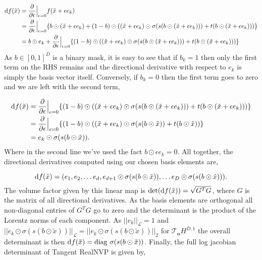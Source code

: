 \begin{align*}
    \textnormal{d}f(\tilde{x}) &= \frac{\partial}{\partial \epsilon} \Big |_{\epsilon=0} f(\tilde{x} + \epsilon e_k)\\
    & = \frac{\partial}{\partial \epsilon} \Big |_{\epsilon=0} \{b \odot (\tilde{x} + \epsilon e_k) + (1 - b)\odot((\tilde{x} + \epsilon e_k) \odot \sigma(s(b \odot (\tilde{x} + \epsilon e_k))) + t(b \odot (\tilde{x} + \epsilon e_k)))\} \\
    &= b \odot  e_k + \frac{\partial}{\partial \epsilon} \Big |_{\epsilon=0}\{ (1 - b)\odot((\tilde{x} + \epsilon e_k) \odot \sigma(s(b \odot (\tilde{x} + \epsilon e_k))) + t(b \odot (\tilde{x} + \epsilon e_k)))\} \\
\end{align*}
As $b \in [0,1]^D$ is a binary mask, it is easy to see that if $b_k =1$ then only the first term on the RHS remains and the directional derivative with respect to $e_k$ is simply the basis vector itself. Conversely, if $b_k =0$ then the first term goes to zero and we are left with the second term,

\begin{align*}
    \textnormal{d}f(\tilde{x}) &= \frac{\partial}{\partial \epsilon} \Big |_{\epsilon=0}\{ (1 - b)\odot((\tilde{x} + \epsilon e_k) \odot \sigma(s(b \odot (\tilde{x} + \epsilon e_k))) + t(b \odot (\tilde{x} + \epsilon e_k)))\} \\
    &=  \frac{\partial}{\partial \epsilon} \Big |_{\epsilon=0}\{ (1 - b)\odot((\tilde{x} + \epsilon e_k) \odot \sigma(s(b \odot \tilde{x})) + t(b \odot \tilde{x}))\} \\
    &= e_k \odot \sigma(s(b \odot \tilde{x})).
\end{align*}
Where in the second line we've used the fact $b \odot \epsilon e_k = 0$. All together, the directional derivatives computed using our chosen basis elements are,

\begin{equation*}
    \textnormal{d}f(\tilde{x}) = (e_1, e_2, \dots e_d, e_{d+1}\odot \sigma(s(b \odot \tilde{x})), \dots e_{D}\odot \sigma(s(b \odot \tilde{x}))).
\end{equation*}
The volume factor given by this linear map is $\textnormal{det}( \textnormal{d}f(\tilde{x})) = \sqrt{G^TG}$, where $G$ is the matrix of all directional derivatives. As the basis elements are orthogonal all non-diagonal entries of $G^TG$ go to zero and the determinant is the product of the Lorentz norms of each component. As $||e_k||_{\mathcal{L}} =1$ and $||e_{k}\odot \sigma(s(b \odot \tilde{x}))||_{\mathcal{L}} = ||e_{k}\odot \sigma(s(b \odot \tilde{x}))||_2$ for $\mathcal{T}_{\mathbf{o}}H^{D,1}$ the overall determinant is then $\textnormal{d}f(\tilde{x}) = \textnormal{diag} \ \sigma(s(b \odot \tilde{x}))$. Finally, the full log jacobian determinant of Tangent RealNVP is given by,


